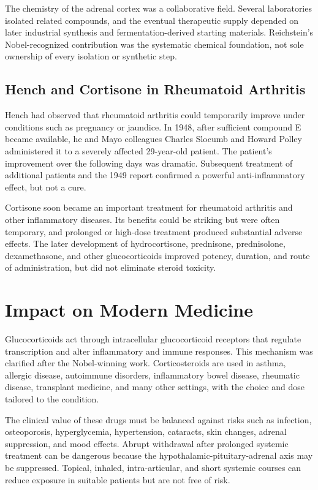 The chemistry of the adrenal cortex was a collaborative field. Several laboratories isolated related compounds, and the eventual therapeutic supply depended on later industrial synthesis and fermentation-derived starting materials. Reichstein's Nobel-recognized contribution was the systematic chemical foundation, not sole ownership of every isolation or synthetic step.

\subsection{Hench and Cortisone in Rheumatoid Arthritis}

Hench had observed that rheumatoid arthritis could temporarily improve under conditions such as pregnancy or jaundice. In 1948, after sufficient compound E became available, he and Mayo colleagues Charles Slocumb and Howard Polley administered it to a severely affected 29-year-old patient. The patient's improvement over the following days was dramatic. Subsequent treatment of additional patients and the 1949 report confirmed a powerful anti-inflammatory effect, but not a cure.

Cortisone soon became an important treatment for rheumatoid arthritis and other inflammatory diseases. Its benefits could be striking but were often temporary, and prolonged or high-dose treatment produced substantial adverse effects. The later development of hydrocortisone, prednisone, prednisolone, dexamethasone, and other glucocorticoids improved potency, duration, and route of administration, but did not eliminate steroid toxicity.

\section{Impact on Modern Medicine}

Glucocorticoids act through intracellular glucocorticoid receptors that regulate transcription and alter inflammatory and immune responses. This mechanism was clarified after the Nobel-winning work. Corticosteroids are used in asthma, allergic disease, autoimmune disorders, inflammatory bowel disease, rheumatic disease, transplant medicine, and many other settings, with the choice and dose tailored to the condition.

The clinical value of these drugs must be balanced against risks such as infection, osteoporosis, hyperglycemia, hypertension, cataracts, skin changes, adrenal suppression, and mood effects. Abrupt withdrawal after prolonged systemic treatment can be dangerous because the hypothalamic-pituitary-adrenal axis may be suppressed. Topical, inhaled, intra-articular, and short systemic courses can reduce exposure in suitable patients but are not free of risk.

